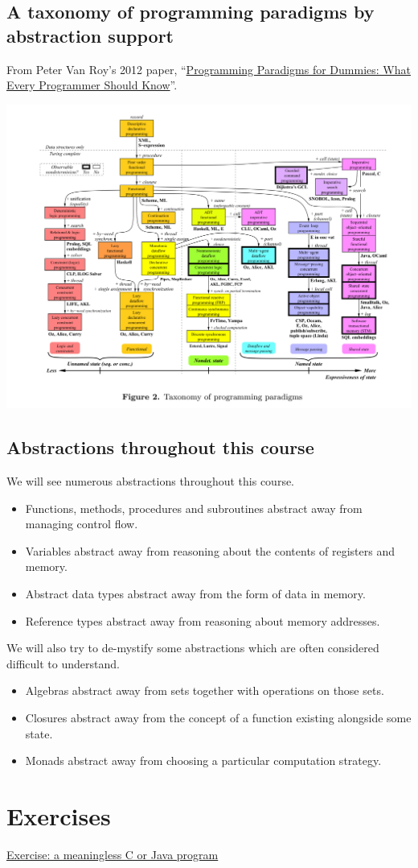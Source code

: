 \documentclass[11pt]{article}
\theoremstyle{definition}
\begin{document}
\subsection{A taxonomy of programming paradigms by abstraction support}
\label{sec:org2fd130b}

From Peter Van Roy's 2012 paper,
“\href{https://www.info.ucl.ac.be/\~pvr/VanRoyChapter.pdf}{Programming Paradigms for Dummies: What Every Programmer Should Know}”.

\includegraphics[width=\textwidth]{./media/vanroy-paradigm-chart.png}

\subsection{Abstractions throughout this course}
\label{sec:org5445a47}

We will see numerous abstractions throughout this course.
\begin{itemize}
\item Functions, methods, procedures and subroutines abstract away from
managing control flow.
\item Variables abstract away from reasoning about the contents of
registers and memory.
\item Abstract data types abstract away from the form of data in memory.
\item Reference types abstract away from reasoning about memory addresses.
\end{itemize}

We will also try to de-mystify some abstractions
which are often considered difficult to understand.
\begin{itemize}
\item Algebras abstract away from sets together with operations on those sets.
\item Closures abstract away from the concept of a function
existing alongside some state.
\item Monads abstract away from choosing a particular computation strategy.
\end{itemize}

\section{Exercises}
\label{sec:org6e1a57f}
\hyperref[sec:org0adb9e7]{Exercise: a meaningless C or Java program}
\end{document}
